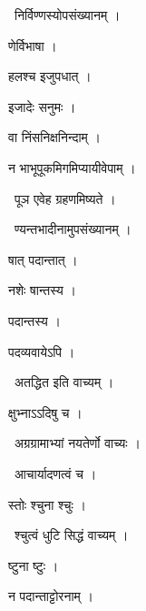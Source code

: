 \documentclass[10pt, openany, oneside]{book}
\begin{document}
\par\noindent\hspace{1.5em}{\vps वा॰}~{\qt निर्विण्णस्योपसंख्यानम् ।}

\noindent णेर्विभाषा ।

\noindent हलश्च इजुपधात् ।

\noindent इजादेः सनुमः ।

\noindent वा निंसनिक्षनिन्दाम् ।

\noindent न भाभूपूकमिगमिप्यायीवेपाम् ।

\par\noindent\hspace{1.5em}{\vps वा॰}~{\qt पूञ एवेह ग्रहणमिष्यते ।}

\par\noindent\hspace{1.5em}{\vps वा॰}~{\qt ण्यन्तभादीनामुपसंख्यानम् ।}

\noindent षात् पदान्तात् ।

\noindent नशेः षान्तस्य ।

\noindent पदान्तस्य ।

\noindent पदव्यवायेऽपि ।

\par\noindent\hspace{1.5em}{\vps वा॰}~{\qt अतद्धित इति वाच्यम् ।}

\noindent क्षुभ्नाऽऽदिषु च ।

\par\noindent\hspace{1.5em}{\vps वा॰}~{\qt अग्रग्रामाभ्यां नयतेर्णो वाच्यः ।}

\par\noindent\hspace{1.5em}{\vps वा॰}~{\qt आचार्यादणत्वं च ।}

\noindent स्तोः श्चुना श्चुः ।

\par\noindent\hspace{1.5em}{\vps वा॰}~{\qt श्चुत्वं धुटि सिद्धं वाच्यम् ।}

\noindent ष्टुना ष्टुः ।

\noindent न पदान्ताट्टोरनाम् ।
\end{document}
